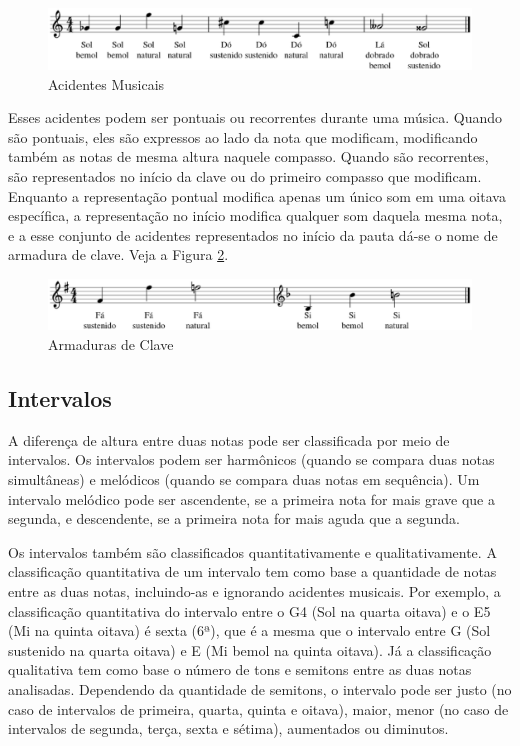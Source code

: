       \begin{figure}[htb]
        \centering
        \includegraphics[scale=0.6]{figuras/acidentesmusicais.eps}
        \caption{Acidentes Musicais}
        \label{acidentes}
      \end{figure}

      Esses acidentes podem ser pontuais ou recorrentes durante uma música. Quando são pontuais, eles são expressos ao lado da nota que modificam, modificando também as notas de mesma altura naquele compasso. Quando são recorrentes, são representados no início da clave ou do primeiro compasso que modificam. Enquanto a representação pontual modifica apenas um único som em uma oitava específica, a representação no início modifica qualquer som daquela mesma nota, e a esse conjunto de acidentes representados no início da pauta dá-se o nome de armadura de clave. Veja a Figura \ref{armadura}.

      \begin{figure}[htb]
        \centering
        \includegraphics[scale=0.6]{figuras/armadura.eps}
        \caption{Armaduras de Clave}
        \label{armadura}
      \end{figure}

    \subsection[Intervalos]{Intervalos}

      A diferença de altura entre duas notas pode ser classificada por meio de intervalos. Os intervalos podem ser harmônicos (quando se compara duas notas simultâneas) e melódicos (quando se compara duas notas em sequência). Um intervalo melódico pode ser ascendente, se a primeira nota for mais grave que a segunda, e descendente, se a primeira nota for mais aguda que a segunda.

      Os intervalos também são classificados quantitativamente e qualitativamente. A classificação quantitativa de um intervalo tem como base a quantidade de notas entre as duas notas, incluindo-as e ignorando acidentes musicais. Por exemplo, a classificação quantitativa do intervalo entre o G4 (Sol na quarta oitava) e o E5 (Mi na quinta oitava) é sexta (6ª), que é a mesma que o intervalo entre G (Sol sustenido na quarta oitava) e E (Mi bemol na quinta oitava). Já a classificação qualitativa tem como base o número de tons e semitons entre as duas notas analisadas. Dependendo da quantidade de semitons, o intervalo pode ser justo (no caso de intervalos de primeira, quarta, quinta e oitava), maior, menor (no caso de intervalos de segunda, terça, sexta e sétima), aumentados ou diminutos.


